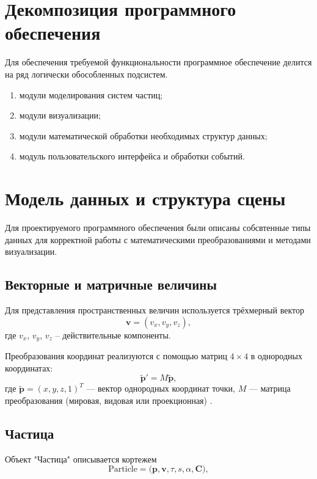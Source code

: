 \section{Декомпозиция программного обеспечения}

Для обеспечения требуемой функциональности программное обеспечение делится на ряд логически обособленных подсистем.
\begin{enumerate}
	\item модули моделирования систем частиц;
	\item модули визуализации;
	\item модули математической обработки необходимых структур данных;
	\item модуль пользовательского интерфейса и обработки событий.
\end{enumerate}

\section{Модель данных и структура сцены}
Для проектируемого программного обеспечения были описаны собсвтенные типы данных для корректной работы с математическими преобразованиями и методами визуализации.

\subsection{Векторные и матричные величины}

Для представления пространственных величин используется трёхмерный вектор
\begin{equation}
	\mathbf{v} = (v_{x}, v_{y}, v_{z}),
\end{equation}
где $v_{x}$, $v_{y}$, $v_{z}$ -- действительные компоненты.

Преобразования координат реализуются с помощью матриц $4 \times 4$ в однородных координатах:
\begin{equation}
	\tilde{\mathbf{p}}' = M \tilde{\mathbf{p}},
\end{equation}
где $\tilde{\mathbf{p}} = (x, y, z, 1)^{T}$ --- вектор однородных координат точки, $M$ --- матрица преобразования (мировая, видовая или проекционная) \cite{RogersAdams}.

\subsection{Частица}

Объект "Частица" описывается кортежем
\begin{equation}
	\text{Particle} = \bigl( \mathbf{p}, \mathbf{v}, \tau, s, \alpha, \mathbf{C} \bigr),
\end{equation}

